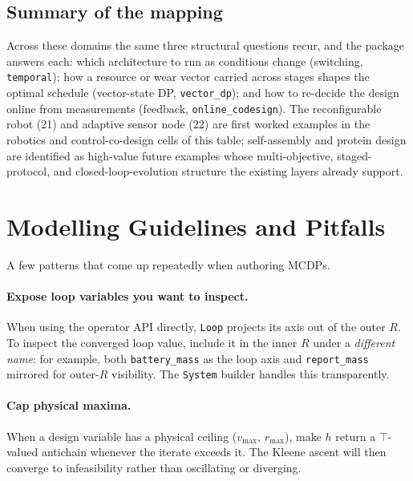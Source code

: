 \documentclass[11pt,a4paper]{article}
\newcommand{\topp}{\top}
\begin{document}
\subsection{Summary of the mapping}

Across these domains the same three structural questions recur, and the
package answers each: which architecture to run as conditions change
(switching, \texttt{temporal}); how a resource or wear vector carried
across stages shapes the optimal schedule (vector-state DP,
\texttt{vector\_dp}); and how to re-decide the design online from
measurements (feedback, \texttt{online\_codesign}). The reconfigurable
robot (21) and adaptive sensor node (22) are first worked examples in the
robotics and control-co-design cells of this table; self-assembly and
protein design are identified as high-value future examples whose
multi-objective, staged-protocol, and closed-loop-evolution structure the
existing layers already support.

\section{Modelling Guidelines and Pitfalls}
\label{sec:guidelines}

A few patterns that come up repeatedly when authoring MCDPs.



\paragraph{Expose loop variables you want to inspect.} When using the
operator API directly, \texttt{Loop} projects its axis out of the
outer $R$. To inspect the converged loop value, include it in the
inner $R$ under a \emph{different name}: for example, both
\texttt{battery\_mass} as the loop axis and \texttt{report\_mass}
mirrored for outer-$R$ visibility. The \texttt{System} builder
handles this transparently.

\paragraph{Cap physical maxima.} When a design variable has a
physical ceiling ($v_{\max}$, $r_{\max}$), make $h$ return a
$\topp$-valued antichain whenever the iterate exceeds it. The Kleene
ascent will then converge to infeasibility rather than oscillating
or diverging.
\end{document}
